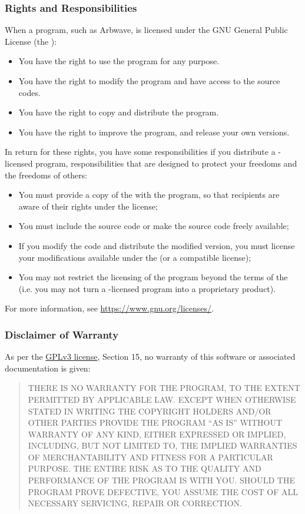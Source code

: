 \subsubsection{Rights and Responsibilities}
When a program, such as Arbwave, is licensed under the GNU General Public
License (the ):
\begin{itemize}[noitemsep,partopsep=0em,parsep=0em]
\item You have the right to use the program for any purpose.
\item You have the right to modify the program and have access to the source codes.
\item You have the right to copy and distribute the program.
\item You have the right to improve the program, and release your own versions.
\end{itemize}

In return for these rights, you have some responsibilities if you distribute a
-licensed program, responsibilities that are designed to protect your
freedoms and the freedoms of others:
\begin{itemize}[noitemsep,partopsep=0em,parsep=0em]
\item You must provide a copy of the  with the program, so that
      recipients are aware of their rights under the license;
\item You must include the source code or make the source code freely available;
\item If you modify the code and distribute the modified version, you must
      license your modifications available under the  (or a compatible
      license);
\item You may not restrict the licensing of the program beyond the terms of the
       (i.e. you may not turn a -licensed program into a
      proprietary product).
\end{itemize}
For more information, see \url{https://www.gnu.org/licenses/}.


\subsubsection{Disclaimer of Warranty}
As per the \href{https://www.gnu.org/licenses/gpl-3.0.en.html}{GPLv3 license},
Section 15, no warranty of this software or associated documentation is
given\cite{gplv3}:
\begin{quote}
THERE IS NO WARRANTY FOR THE PROGRAM, TO THE EXTENT PERMITTED BY APPLICABLE LAW.
EXCEPT WHEN OTHERWISE STATED IN WRITING THE COPYRIGHT HOLDERS AND/OR OTHER
PARTIES PROVIDE THE PROGRAM “AS IS” WITHOUT WARRANTY OF ANY KIND, EITHER
EXPRESSED OR IMPLIED, INCLUDING, BUT NOT LIMITED TO, THE IMPLIED WARRANTIES OF
MERCHANTABILITY AND FITNESS FOR A PARTICULAR PURPOSE. THE ENTIRE RISK AS TO THE
QUALITY AND PERFORMANCE OF THE PROGRAM IS WITH YOU. SHOULD THE PROGRAM PROVE
DEFECTIVE, YOU ASSUME THE COST OF ALL NECESSARY SERVICING, REPAIR OR CORRECTION.
\end{quote}


